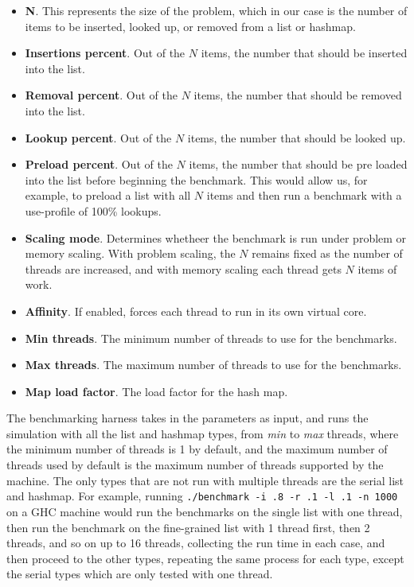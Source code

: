 \documentclass[11pt]{article}
\begin{document}
\begin{itemize}
\item
{\bf N}. This represents the size of the problem, which in our case is the
number of items to be inserted, looked up, or removed from a list or hashmap.
\item
{\bf Insertions percent}. Out of the $N$ items, the number that should be
inserted into the list.
\item
{\bf Removal percent}. Out of the $N$ items, the number that should be removed
into the list.
\item
{\bf Lookup percent}. Out of the $N$ items, the number that should be looked up.
\item
{\bf Preload percent}. Out of the $N$ items, the number that should be pre
loaded into the list before beginning the benchmark. This would allow us, for
example, to preload a list with all $N$ items and then run a benchmark with a
use-profile of 100\% lookups.
\item
{\bf Scaling mode}. Determines whetheer the benchmark is run under problem or
memory scaling. With problem scaling, the $N$ remains fixed as the number of
threads are increased, and with memory scaling each thread gets $N$ items of
work.
\item
{\bf Affinity}. If enabled, forces each thread to run in its own virtual core.
\item
{\bf Min threads}. The minimum number of threads to use for the benchmarks.
\item
{\bf Max threads}. The maximum number of threads to use for the benchmarks.
\item
{\bf Map load factor}. The load factor for the hash map.
\end{itemize}

The benchmarking harness takes in the parameters as input, and runs the
simulation with all the list and hashmap types, from {\it min} to {\it max}
threads, where the minimum number of threads is 1 by default, and the maximum
number of threads used by default is the maximum number of threads supported by
the machine. The only types that are not run with multiple threads are the
serial list and hashmap. For example, running
{\tt ./benchmark -i .8 -r .1 -l .1 -n 1000} on a GHC machine would run the
benchmarks on the single list with one thread, then run the benchmark on the
fine-grained list with 1 thread first, then 2 threads, and so on up to 16
threads, collecting the run time in each case, and then proceed to the other
types, repeating the same process for each type, except the serial types which
are only tested with one thread.
\end{document}
